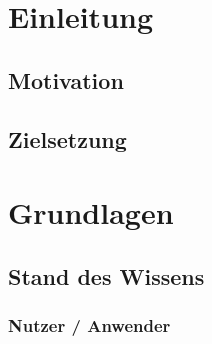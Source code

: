\documentclass[a4paper, 12pt]{article}
\begin{document}
\sloppy

\newpage
\thispagestyle{plain}
\tableofcontents
\newpage
\thispagestyle{plain}
\listoffigures

\newpage
\clearpage 
{}   

\section{Einleitung}
\label{sec:Einleitung}



\subsection{Motivation}
\label{subsec:Motivation}



\subsection{Zielsetzung}
\label{subsec:Zielsetzung}


\section{Grundlagen}
\label{sec:Grundlagen}



\subsection{Stand des Wissens}
\label{sec:Stand des Wissens}



\subsubsection{Nutzer / Anwender}
\label{sec:Nutzer / Anwender}
\end{document}
